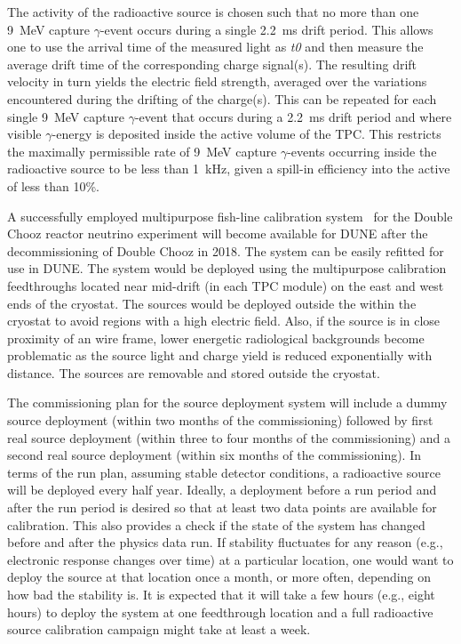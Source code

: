 The activity of the radioactive source is chosen such that no more than one \SI{9}{\MeV} capture $\gamma$-event occurs during a single \SI{2.2}{\milli\s} drift period. This allows one to use the arrival time of the measured light as {\it t0} and then measure the average drift time of the corresponding charge signal(s). The resulting drift velocity in turn yields the electric field strength, averaged over the variations encountered during the drifting of the charge(s). This can be repeated for each single \SI{9}{\MeV} capture $\gamma$-event that occurs during a \SI{2.2}{\milli\s} drift period and where visible $\gamma$-energy is deposited inside the active volume of the TPC. This restricts the maximally permissible rate of \SI{9}{\MeV} capture $\gamma$-events occurring inside the radioactive source to be less
than \SI{1}{\kilo\hertz}, given a spill-in efficiency into the active  of
less than \num{10}\%.

A successfully employed multipurpose fish-line calibration system~\cite{}  for the Double Chooz reactor neutrino experiment will become available for DUNE after the decommissioning of Double Chooz in 2018. The system can be easily refitted for use in DUNE. The system would be deployed using the multipurpose calibration feedthroughs located near mid-drift (in each TPC module) on the east and west ends of the cryostat.
The sources would be deployed outside the  within the cryostat to avoid regions with a high electric field. Also, if the source is in close proximity of an  wire frame, lower energetic radiological backgrounds become problematic as the source light and charge yield is reduced exponentially with distance. The sources are removable and stored outside the cryostat.

The commissioning plan for the source deployment system will include a dummy 
source deployment (within two months of the commissioning) followed by first real source deployment (within three to four months of the commissioning) and a second real source deployment (within six months of the commissioning). In terms of the run plan, assuming stable detector conditions, a radioactive source will be deployed every half year. Ideally, a deployment before a run period and after the run period is desired so that at least two data points are available for calibration. This also provides a check if the state of the system has changed before and after the physics data run. If stability fluctuates for any reason (e.g., electronic response changes over time) at a particular location, one would want to deploy the source at that location once a month, or more often, depending on how bad the stability is. It is expected that it will take a few hours (e.g., eight hours) to deploy the system at one feedthrough location and a full radioactive source calibration campaign might take at least a week.


